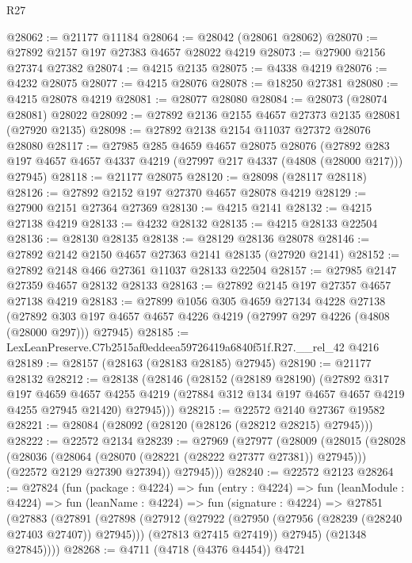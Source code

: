 \begin{lexlean}{R27}
\begin{coremodule}
@28062 := @21177 @11184
@28064 := @28042 (@28061 @28062)
@28070 := @27892 @2157 @197 @27383 @4657 @28022 @4219
@28073 := @27900 @2156 @27374 @27382
@28074 := @4215 @2135
@28075 := @4338 @4219
@28076 := @4232 @28075
@28077 := @4215 @28076
@28078 := @18250 @27381
@28080 := @4215 @28078 @4219
@28081 := @28077 @28080
@28084 := @28073 (@28074 @28081) @28022
@28092 := @27892 @2136 @2155 @4657 @27373 @2135 @28081 (@27920 @2135)
@28098 := @27892 @2138 @2154 @11037 @27372 @28076 @28080
@28117 := @27985
    @285
    @4659
    @4657
    @28075
    @28076
    (@27892 @283 @197 @4657 @4657 @4337 @4219 (@27997 @217 @4337 (@4808 (@28000 @217))) @27945)
@28118 := @21177 @28075
@28120 := @28098 (@28117 @28118)
@28126 := @27892 @2152 @197 @27370 @4657 @28078 @4219
@28129 := @27900 @2151 @27364 @27369
@28130 := @4215 @2141
@28132 := @4215 @27138 @4219
@28133 := @4232 @28132
@28135 := @4215 @28133 @22504
@28136 := @28130 @28135
@28138 := @28129 @28136 @28078
@28146 := @27892 @2142 @2150 @4657 @27363 @2141 @28135 (@27920 @2141)
@28152 := @27892 @2148 @466 @27361 @11037 @28133 @22504
@28157 := @27985 @2147 @27359 @4657 @28132 @28133
@28163 := @27892 @2145 @197 @27357 @4657 @27138 @4219
@28183 := @27899
    @1056
    @305
    @4659
    @27134
    @4228
    @27138
    (@27892 @303 @197 @4657 @4657 @4226 @4219 (@27997 @297 @4226 (@4808 (@28000 @297))) @27945)
@28185 := LexLeanPreserve.C7b2515af0eddeea59726419a6840f51f.R27.__rel_42 @4216
@28189 := @28157 (@28163 (@28183 @28185) @27945)
@28190 := @21177 @28132
@28212 := @28138
    (@28146
      (@28152
        (@28189 @28190)
        (@27892
          @317
          @197
          @4659
          @4657
          @4255
          @4219
          (@27884 @312 @134 @197 @4657 @4657 @4219 @4255 @27945 @21420)
          @27945)))
@28215 := @22572 @2140 @27367 @19582
@28221 := @28084 (@28092 (@28120 (@28126 (@28212 @28215) @27945)))
@28222 := @22572 @2134
@28239 := @27969
    (@27977
      (@28009
        (@28015
          (@28028
            (@28036 (@28064 (@28070 (@28221 (@28222 @27377 @27381)) @27945)))
            (@22572 @2129 @27390 @27394))
          @27945)))
@28240 := @22572 @2123
@28264 := @27824
    (fun (package : @4224) =>
    fun (entry : @4224) =>
    fun (leanModule : @4224) =>
    fun (leanName : @4224) =>
    fun (signature : @4224) =>
    @27851
      (@27883
        (@27891
          (@27898
            (@27912
              (@27922 (@27950 (@27956 (@28239 (@28240 @27403 @27407)) @27945)))
              (@27813 @27415 @27419))
            @27945)
          (@21348 @27845))))
@28268 := @4711 (@4718 (@4376 @4454)) @4721

\end{coremodule}
\end{lexlean}
